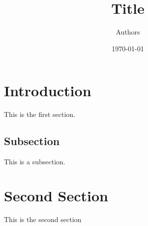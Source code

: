 \documentclass{article}
\title{Title}
\author{Authors}
\date{\today}
\begin{document}
\maketitle
\section{Introduction}

This is the first section.

\subsection{Subsection} 

This is a subsection.
\section{Second Section}
This is the second section
\end{document}
